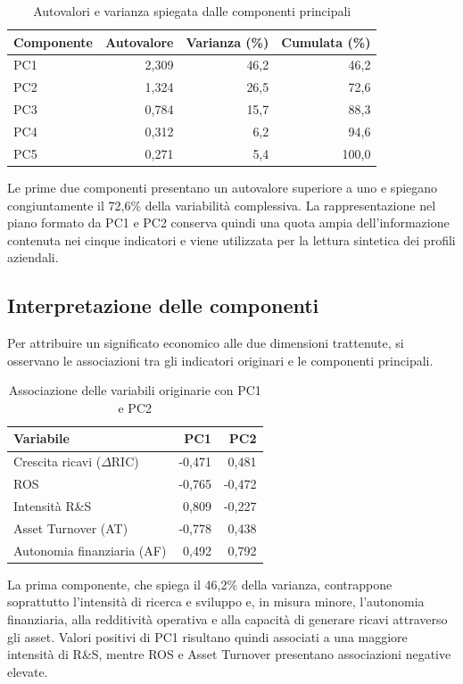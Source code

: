 \documentclass[11pt,a4paper]{article}
\begin{document}
\begin{table}[H]
\centering
\caption{Autovalori e varianza spiegata dalle componenti principali}
\small
\begin{tabular}{lrrr}
\toprule
\textbf{Componente} & \textbf{Autovalore} & \textbf{Varianza (\%)} & \textbf{Cumulata (\%)} \\
\midrule
PC1 & 2,309 & 46,2 & 46,2 \\
PC2 & 1,324 & 26,5 & 72,6 \\
PC3 & 0,784 & 15,7 & 88,3 \\
PC4 & 0,312 & 6,2 & 94,6 \\
PC5 & 0,271 & 5,4 & 100,0 \\
\bottomrule
\end{tabular}
\end{table}

Le prime due componenti presentano un autovalore superiore a uno e spiegano congiuntamente il 72,6\% della variabilità complessiva. La rappresentazione nel piano formato da PC1 e PC2 conserva quindi una quota ampia dell'informazione contenuta nei cinque indicatori e viene utilizzata per la lettura sintetica dei profili aziendali.

\subsection{Interpretazione delle componenti}

Per attribuire un significato economico alle due dimensioni trattenute, si osservano le associazioni tra gli indicatori originari e le componenti principali.

\begin{table}[H]
\centering
\caption{Associazione delle variabili originarie con PC1 e PC2}
\small
\begin{tabular}{lrr}
\toprule
\textbf{Variabile} & \textbf{PC1} & \textbf{PC2} \\
\midrule
Crescita ricavi ($\Delta$RIC) & -0,471 & 0,481 \\
ROS & -0,765 & -0,472 \\
Intensità R\&S & 0,809 & -0,227 \\
Asset Turnover (AT) & -0,778 & 0,438 \\
Autonomia finanziaria (AF) & 0,492 & 0,792 \\
\bottomrule
\end{tabular}
\end{table}

La prima componente, che spiega il 46,2\% della varianza, contrappone soprattutto l'intensità di ricerca e sviluppo e, in misura minore, l'autonomia finanziaria, alla redditività operativa e alla capacità di generare ricavi attraverso gli asset. Valori positivi di PC1 risultano quindi associati a una maggiore intensità di R\&S, mentre ROS e Asset Turnover presentano associazioni negative elevate.
\end{document}
